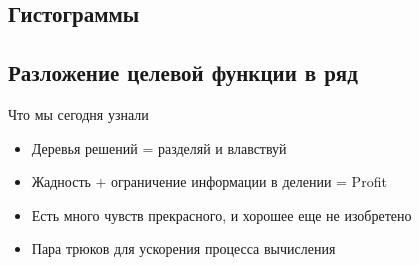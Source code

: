 \documentclass[14pt, fleqn, xcolor={dvipsnames, table}]{beamer}
\begin{document}
\subsection{Гистограммы}
\subsection{Разложение целевой функции в ряд}

\begin{frame}{Что мы сегодня узнали}
\begin{itemize}
  \item Деревья решений = разделяй и влавствуй
  \item Жадность + ограничение информации в делении = Profit
  \item Есть много чувств прекрасного, и хорошее еще не изобретено
  \item Пара трюков для ускорения процесса вычисления
\end{itemize}
\end{frame}
\end{document}
